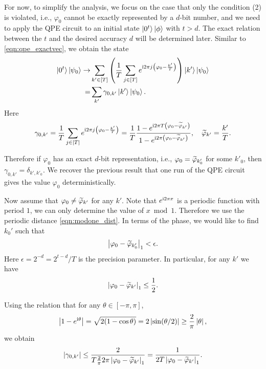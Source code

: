 For now, to simplify the analysis, we focus on the case that only the condition (2) is violated, i.e., $\varphi_0$ cannot be exactly represented by a $d$-bit number, and we need to apply the QPE circuit to an initial state $\ket{0^t}\ket{\phi}$ with $t>d$.
The exact relation between the $t$ and the desired accuracy $d$ will be determined later.
Similar to \cref{eqn:qpe_exactvec}, we obtain the state
\begin{equation}
\begin{split}
\ket{0^t}\ket{\psi_0} \to&\sum_{k'\in[T]}\left(\frac{1}{T}\sum_{j\in[T]}
e^{\mathrm{i} 2\pi j\left(\varphi_0 -\frac{k'}{T}\right)}\right)\ket{k'}\ket{\psi_0}\\
=& \sum_{k'} \gamma_{0,k'}\ket{k'}\ket{\psi_0}.
\end{split}
\label{eqn:qpe_inexactvec}
\end{equation}
Here 
\begin{equation}
\gamma_{0,k'}=\frac{1}{T}\sum_{j\in[T]}
e^{\mathrm{i} 2\pi j\left(\varphi_0 -\frac{k'}{T}\right)}=\frac{1}{T}\frac{1-e^{\mathrm{i} 2\pi T\left(\varphi_0 - \widetilde{\varphi}_{k'}\right)}}{1-e^{\mathrm{i} 2\pi \left(\varphi_0 - \widetilde{\varphi}_{k'}\right)}}, \quad \widetilde{\varphi}_{k'}=\frac{k'}{T}.
\label{eqn:gamma_0k}
\end{equation}
 
Therefore if $\varphi_0$ has an exact $d$-bit representation, i.e., $\varphi_0=\widetilde{\varphi}_{k'_0}$ for some $k'_0$, then $\gamma_{0,k'}=\delta_{k',k'_0}$. 
We recover the previous result that one run of the QPE circuit gives the value $\varphi_0$ deterministically.


Now assume that $\varphi_0 \ne \widetilde{\varphi}_{k'}$ for any $k'$. 
Note that $e^{\mathrm{i} 2\pi x}$ is a periodic function with period $1$, we can only determine the value of $x \bmod 1$. 
Therefore  we use the periodic distance \cref{eqn:modone_dist}.
In terms of the phase, we would like to find $k_0'$ such that
\begin{equation}
\left\lvert\varphi_{0} - \widetilde{\varphi}_{k'_0}\right\rvert_1 < \epsilon.
\end{equation}
Here $\epsilon=2^{-d}=2^{t-d}/T$ is the precision parameter. 
In particular, for any $k'$ we have
\begin{equation}
\left\lvert\varphi_{0} - \widetilde{\varphi}_{k'}\right\rvert_1 \le \frac12.
\end{equation}

Using the relation that for any $\theta\in[-\pi,\pi]$,
\begin{equation}
\left\lvert1-e^{\mathrm{i}\theta}\right\rvert=\sqrt{2(1-\cos\theta)}=2 \left\lvert\sin(\theta/2)\right\rvert\ge \frac{2}{\pi }\left\lvert\theta\right\rvert,
\end{equation}
we obtain
\begin{equation}
\left\lvert\gamma_{0,k'}\right\rvert\le \frac{2}{T \frac{2}{\pi} 2\pi \left\lvert\varphi_{0} - \widetilde{\varphi}_{k'}\right\rvert_1}
=\frac{1}{2T \left\lvert\varphi_{0} - \widetilde{\varphi}_{k'}\right\rvert_1}.
\end{equation}

